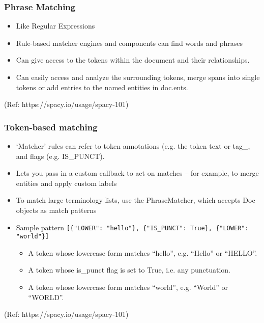 \begin{frame}[fragile]\frametitle{Phrase Matching }

  \begin{itemize}
    \item Like Regular Expressions
		\item Rule-based matcher engines and components can find words and phrases
		\item Can give access to the tokens within the document and their relationships.
		\item Can easily access and analyze the surrounding tokens, merge spans into single tokens or add entries to the named entities in doc.ents.
  \end{itemize}
	
{\tiny (Ref: https://spacy.io/usage/spacy-101)}
\end{frame}

\begin{frame}[fragile]\frametitle{Token-based matching }

  \begin{itemize}
    \item `Matcher' rules can refer to token annotations (e.g. the token text or tag\_, and flags (e.g. IS\_PUNCT).
		\item Lets you pass in a custom callback to act on matches – for example, to merge entities and apply custom labels
		\item To match large terminology lists, use the PhraseMatcher, which accepts Doc objects as match patterns
		\item Sample pattern \lstinline|[{"LOWER": "hello"}, {"IS_PUNCT": True}, {"LOWER": "world"}]|
  \begin{itemize}
    \item A token whose lowercase form matches “hello”, e.g. “Hello” or “HELLO”.
    \item A token whose is\_punct flag is set to True, i.e. any punctuation.
    \item A token whose lowercase form matches “world”, e.g. “World” or “WORLD”.
  \end{itemize}		
  \end{itemize}
	
{\tiny (Ref: https://spacy.io/usage/spacy-101)}
\end{frame}


